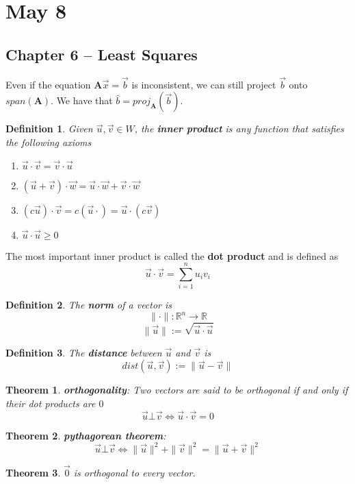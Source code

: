\documentclass[11pt]{article}
\newtheorem{thm}{Theorem}
\newtheorem{defn}{Definition}
\begin{document}
\section{May 8}


\subsection{Chapter 6 -- Least Squares}

Even if the equation $\mathbf{A}\vec{x} = \vec{b}$ is inconsistent, we can still project $\vec{b}$ onto $span(\mathbf{A})$. We have
that $\hat{b} = proj_{\mathbf{A}}(\vec{b})$.

\begin{defn}
  Given $\vec{u}, \vec{v} \in W$, the \textbf{inner product} is any function that satisfies the following axioms
  \begin{enumerate}
    \item $\vec{u} \cdot \vec{v} = \vec{v} \cdot \vec{u}$
    \item $(\vec{u} + \vec{v}) \cdot \vec{w} = \vec{u}\cdot \vec{w} + \vec{v}\cdot\vec{w} $
    \item $(c \vec{u}) \cdot \vec{v} = c(\vec{u} \cdot) = \vec{u} \cdot (c \vec{v})$
    \item $\vec{u} \cdot \vec{u} \ge 0$
  \end{enumerate}
\end{defn}

The most important inner product is called the \textbf{dot product} and is defined as
\[\vec{u} \cdot \vec{v} = \sum_{i=1}^{n} u_{i}v_{i}\]

\begin{defn}
  The \textbf{norm} of a vector is
  \[\|\cdot \| : \mathbb{R}^{n} \to \mathbb{R}\]
  \[\|\vec{u}\| := \sqrt{\vec{u} \cdot \vec{u}}\]
\end{defn}

\begin{defn}
  The \textbf{distance} between $\vec{u}$ and $\vec{v}$ is
  \[dist(\vec{u}, \vec{v}) := \| \vec{u} - \vec{v} \|\]
\end{defn}

\begin{thm}
  \textbf{orthogonality}: Two vectors are said to be orthogonal if and only if their dot products are $0$
  \[\vec{u} \bot \vec{v} \iff \vec{u} \cdot \vec{v} = 0\]
\end{thm}

\begin{thm}
  \textbf{pythagorean theorem}:
  \[\vec{u} \bot \vec{v}  \iff \|\vec{u}\|^{2} + \|\vec{v}\|^{2} = \|\vec{u}+\vec{v}\|^{2}\]
\end{thm}
\begin{thm}
  $\vec{0}$ is orthogonal to every vector.
\end{thm}
\end{document}
